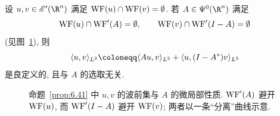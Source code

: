 \begin{proposition}[带波前集条件的 $L^2$ 配对]\label{prop:6.41}
设 $u, v \in \mathscr{E}'(\R^n)$ 满足 $\operatorname{WF}(u) \cap \operatorname{WF}(v) = \emptyset$. 若 $A \in \Psi^0(\R^n)$ 满足
\begin{equation}\label{eq:6.60}
    \operatorname{WF}(u) \cap \operatorname{WF}'(A) = \emptyset, \qquad \operatorname{WF}(v) \cap \operatorname{WF}'(I - A) = \emptyset
\end{equation}
(见图~\ref{fig:6.4}), 则
\begin{equation}\label{eq:6.61}
    \langle u, v \rangle_{L^2} \defeq \langle A u, v \rangle_{L^2} + \langle u, (I - A^*) v \rangle_{L^2}
\end{equation}
是良定义的, 且与 $A$ 的选取无关.
\end{proposition}

\begin{figure}[htbp]
\centering
\drawFigSixFour
\caption{命题~\ref{prop:6.41} 中 $u, v$ 的波前集与 $A$ 的微局部性质. $\operatorname{WF}'(A)$ 避开 $\operatorname{WF}(u)$, 而 $\operatorname{WF}'(I - A)$ 避开 $\operatorname{WF}(v)$; 两者以一条``分离''曲线示意.}
\label{fig:6.4}
\end{figure}

